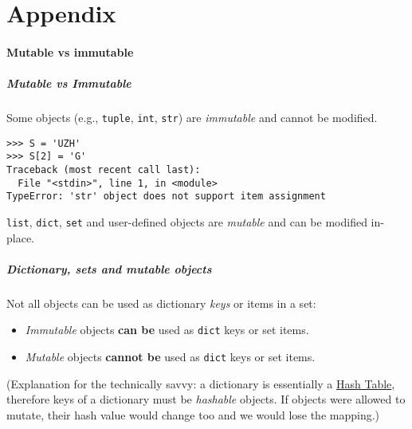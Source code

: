 \documentclass[english,serif,mathserif,xcolor=pdftex,dvipsnames,table]{beamer}
\begin{document}
\part{Appendix}

\subsection{Mutable vs immutable}

\begin{frame}[fragile]
  \frametitle{Mutable vs Immutable}
  Some objects (e.g., \texttt{tuple}, \texttt{int}, \texttt{str})
  are \emph{immutable} and cannot be modified.
\begin{lstlisting}
>>> S = 'UZH'
>>> S[2] = 'G'
Traceback (most recent call last):
  File "<stdin>", line 1, in <module>
TypeError: 'str' object does not support item assignment
\end{lstlisting}


  \+
  \texttt{list}, \texttt{dict}, \texttt{set} and user-defined objects
  are \emph{mutable} and can be modified in-place.
\end{frame}

\begin{frame}[fragile]
  \frametitle{Dictionary, sets and mutable objects}

  Not all objects can be used as dictionary \emph{keys} or items in a
  set:
  \begin{itemize}
    \item
      \textit{Immutable} objects \textbf{can be} used as \texttt{dict} keys or set items.
    \item
      \textit{Mutable} objects  \textbf{cannot be} used as \texttt{dict} keys or set items.
    \end{itemize}

    \+
    {\footnotesize
      (Explanation for the technically savvy: a dictionary is
      essentially a \href{http://en.wikipedia.org/wiki/Hash_table}{Hash
        Table}, therefore keys of a dictionary must be \textit{hashable}
      objects.  If objects were allowed to mutate, their hash value
      would change too and we would lose the mapping.)}
\end{frame}
\end{document}
